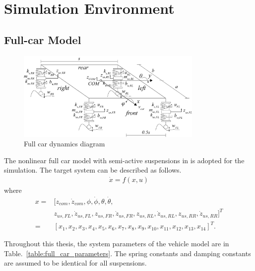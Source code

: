 \chapter{Simulation Environment}

\section{Full-car Model}\label{env:full_car}

  \begin{figure}[ht]
    \centering
    \includegraphics[width=0.8\textwidth]{figures/full_car.png}
    \caption{Full car dynamics diagram}
    \label{fig:full_car}
  \end{figure}

  The nonlinear full car model with semi-active suspensions in \cite{zhu2006chaotic} is adopted for the simulation. The target system can be described as follows. 
  \begin{eqnarray*} \label{eq:basic}
    \dot{x} = f(x,u)
  \end{eqnarray*}
  where 
  \begin{equation*}
    \begin{split}
      x = &[z_{com}, \dot{z}_{com}, \phi, \dot{\phi}, \theta, \dot{\theta},\\ &z_{us,FL},\dot{z}_{us,FL},z_{us,FR},\dot{z}_{us,FR},z_{us,RL},\dot{z}_{us,RL},z_{us,RR},\dot{z}_{us,RR}]^T\\
      = &[x_1,x_2,x_3,x_4,x_5,x_6,x_7,x_8,x_9,x_{10},x_{11},x_{12},x_{13},x_{14}]^T.
    \end{split}
  \end{equation*}
  
  Throughout this thesis, the system parameters of the vehicle model are in Table.~\ref{table:full_car_parameters}. The spring constants and damping constants are assumed to be identical for all suspensions.
  
